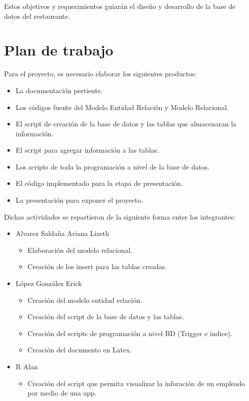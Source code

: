 \documentclass[12pt, letterpaper]{article} %
\begin{document}
Estos objetivos y requerimientos guiarán el diseño y desarrollo de la base de datos del restaurante.


\newpage
\section{Plan de trabajo}
Para el proyecto, es necesario elaborar los siguientes productos:

\begin{itemize}
    \item La documentación pertiente.
    
    \item Los códigos fuente del Modelo Entidad Relación y Modelo Relacional.

    \item El script de creación de la base de datos y las tablas que almacenaran la información.

    \item El script para agregar información a las tablas.

    \item Los scripts de toda la programación a nivel de la base de datos.

    \item El código implementado para la etapa de presentación.

    \item La presentación para exponer el proyecto.

\end{itemize}

Dichas actividades se repartieron de la siguiente forma enter los integrantes:

\begin{itemize}
    \item Alvarez Saldaña Ariana Lizeth
        \begin{itemize}
            \item Elaboración del modelo relacional.
            \item Creación de los insert para las tablas creadas.
        \end{itemize}
    \item López González Erick
        \begin{itemize}
            \item Creación del modelo entidad relación.
            \item Creación del script de la base de datos y las tablas.
            \item Creación del scripts de programación a nivel BD (Trigger e índice).
            \item Creación del documento en Latex.
        \end{itemize}
    \item R Alan
        \begin{itemize}
            \item Creación del script que permita visualizar la inforación de un empleado por medio de una app.
        \end{itemize}
    
\end{itemize}
\end{document}
